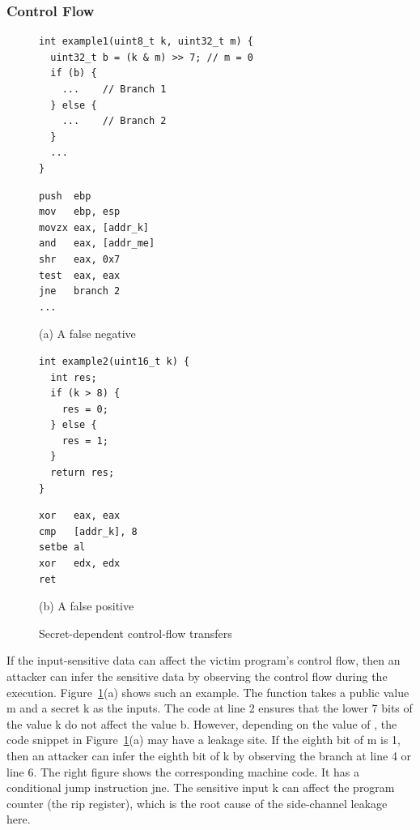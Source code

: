 \subsubsection{Control Flow}
\begin{figure}[ht]
  \begin{minipage}{0.45\linewidth}
    \begin{lstlisting}[xleftmargin=.05\textwidth, xrightmargin=.0\textwidth, frame=none]
int example1(uint8_t k, uint32_t m) { 
  uint32_t b = (k & m) >> 7; // m = 0
  if (b) {
    ...    // Branch 1
  } else {
    ...    // Branch 2
  }
  ...
}
\end{lstlisting}
  \end{minipage}
  \hfill
  \begin{minipage}{0.45\linewidth}
    \begin{lstlisting}[xleftmargin=.05\textwidth, xrightmargin=.00\textwidth, frame=none, numbers=none, mathescape=true]
push  ebp
mov   ebp, esp
movzx eax, [addr_k]    
and   eax, [addr_me] 
shr   eax, 0x7           
test  eax, eax
jne   branch 2
...
\end{lstlisting}
  \end{minipage}\caption*{(a) A false negative}

  \begin{minipage}{0.45\linewidth}
    \begin{lstlisting}[xleftmargin=.05\textwidth, xrightmargin=.0\textwidth, frame=none]
int example2(uint16_t k) {
  int res;
  if (k > 8) {
    res = 0;
  } else {
    res = 1;
  }
  return res;
}
\end{lstlisting}
  \end{minipage}
  \hfill
  \begin{minipage}{0.45\linewidth}
    \begin{lstlisting}[xleftmargin=.05\textwidth, xrightmargin=.00\textwidth, frame=none, numbers=none, mathescape=true]
xor   eax, eax
cmp   [addr_k], 8
setbe al
xor   edx, edx
ret
\end{lstlisting}
  \end{minipage}\caption*{(b) A false positive}
  \caption{Secret-dependent control-flow transfers}\label{fig:chapter3:cf}
\end{figure}

If the input-sensitive data can affect the victim program's control flow, then an attacker can infer the sensitive data by observing the control flow during the execution. Figure~\ref{fig:chapter3:cf}(a) shows such an example. The function takes a public value \textsf{m} and a secret \textsf{k} as the inputs. The code at line 2 ensures that the lower 7 bits of the value \textsf{k} do not affect the value \textsf{b}. However, depending on the value of , the code snippet in Figure~\ref{fig:chapter3:cf}(a) may have a leakage site. If the eighth bit of \textsf{m} is 1, then an attacker can infer the eighth bit of \textsf{k} by observing the branch at line 4 or line 6. The right figure shows the corresponding machine code. It has a conditional jump instruction \textsf{jne}. The sensitive input \textsf{k} can affect the program counter (the \textsf{rip} register), which is the root cause of the side-channel leakage here.

